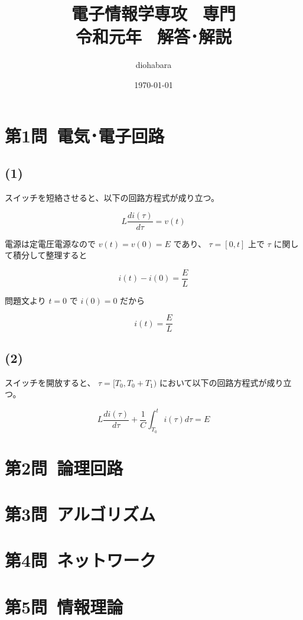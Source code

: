 \documentclass[a4paper,12pt,xelatex,ja=standard]{bxjsarticle}
\title{電子情報学専攻 \, 専門 \\ 令和元年 \, 解答･解説}
\author{diohabara}
\date{\today}
\begin{document}
\maketitle

\section*{第1問\ 電気･電子回路}

\subsection*{(1)}


スイッチを短絡させると、以下の回路方程式が成り立つ。

\[
  L \frac{d i(\tau)}{d \tau} = v(t)
\]

電源は定電圧電源なので \(v(t) = v(0) = E\) であり、 \(\tau = [0, t]\) 上で \(\tau\) に関して積分して整理すると

\[
  i(t) - i(0) = \frac{E}{L}
\]

問題文より $t = 0$ で $i(0) = 0$ だから

\[
  i(t) = \frac{E}{L}
\]

\subsection*{(2)}

スイッチを開放すると、 \(\tau = [T_0, T_0 + T_1)\) において以下の回路方程式が成り立つ。

\[
  L \frac{d i(\tau)}{d \tau} + \frac{1}{C}\int^{t}_{T_0}i(\tau) d \tau = E
\]

\section*{第2問\ 論理回路}
\section*{第3問\ アルゴリズム}
\section*{第4問\ ネットワーク}
\section*{第5問\ 情報理論}
\end{document}
